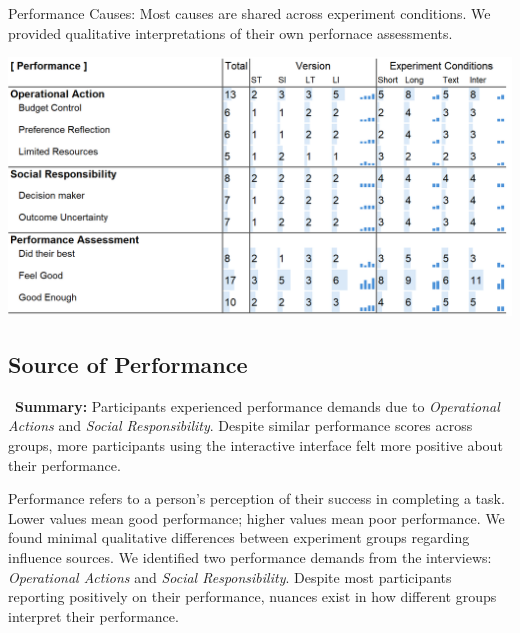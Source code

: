 
\begin{table}[h]
    \caption{Performance Causes: Most causes are shared across experiment conditions. We provided qualitative interpretations of their own perfornace assessments.}
    \label{tbl:physical}
    \includegraphics[width=\linewidth]{content/image/cog/perf_table.png}
\end{table}

\subsection{Source of Performance}
\label{sec:performance}
\vspace{5pt}

\begin{tldrbox}
    \faInfoCircle~\xspace\textbf{Summary:} Participants experienced performance demands due to \textit{Operational Actions} and \textit{Social Responsibility}. Despite similar performance scores across groups, more participants using the interactive interface felt more positive about their performance.
\end{tldrbox}

Performance refers to a person's perception of their success in completing a task. Lower values mean good performance; higher values mean poor performance. We found minimal qualitative differences between experiment groups regarding influence sources. We identified two performance demands from the interviews: \textit{Operational Actions} and \textit{Social Responsibility}. Despite most participants reporting positively on their performance, nuances exist in how different groups interpret their performance.

